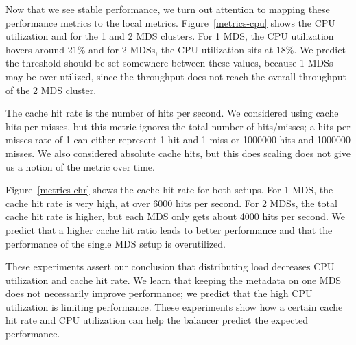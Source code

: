 Now that we see stable performance, we turn out attention to mapping these performance metrics to the local metrics. Figure~\ref{metrics-cpu} shows the CPU utilization and for the 1 and 2 MDS clusters. For 1 MDS, the CPU utilization hovers around 21\% and for 2 MDSs, the CPU utilization sits at 18\%. We predict the threshold should be set somewhere between these values, because 1 MDSs may be over utilized, since the throughput does not reach the overall throughput of the 2 MDS cluster. 

% 
The cache hit rate is the number of hits per second. We considered using cache hits per misses, but this metric ignores the total number of hits/misses; a hits per misses rate of 1 can either represent 1 hit and 1 miss or 1000000 hits and 1000000 misses. We also considered absolute cache hits, but this does scaling does not give us a notion of the metric over time.

Figure~\ref{metrics-chr} shows the cache hit rate for both setups. For 1 MDS, the cache hit rate is very high, at over 6000 hits per second. For 2 MDSs, the total cache hit rate is higher, but each  MDS only gets about 4000 hits per second. We predict that a higher cache hit ratio leads to better performance and that the performance of the single MDS setup is overutilized. 

These experiments assert our conclusion that distributing load decreases CPU utilization and cache hit rate. We learn that keeping the metadata on one MDS does not necessarily improve performance; we predict that the high CPU utilization is limiting performance. These experiments show how a certain cache hit rate and CPU utilization can help the balancer predict the expected performance. 



%



